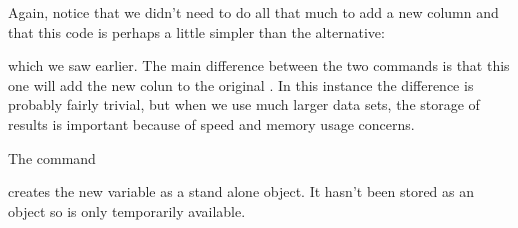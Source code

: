 Again, notice that we didn't need to do all that much to add a new column and that this code is perhaps a little simpler than the alternative: 
\begin{knitrout}
\color{fgcolor}\begin{kframe}
\begin{alltt}
\hlstd{> }\hlopt{$} \hlkwb{=} \hlopt{$} \hlopt{-} \hlstd{)} \hlopt{*}  \hlopt{/} 
\end{alltt}
\end{kframe}
\end{knitrout}
which we saw earlier. The main difference between the two commands is that this one will add the new colun to the original . 
In this instance the difference is probably fairly trivial, but when we use much larger data sets, the storage of results is important because of speed and memory usage concerns. 
 
The command 
\begin{knitrout}
\color{fgcolor}
\end{knitrout}
creates the new variable as a stand alone object. It hasn't been stored as an object so is only temporarily available.  
 

